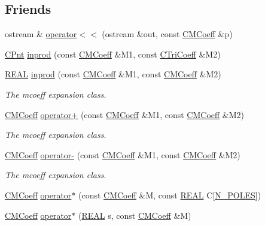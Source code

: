 \subsection*{Friends}
\begin{DoxyCompactItemize}
\item 
ostream \& \hyperlink{classCMCoeff_af219e14c617a293aad17ddf8f055db85}{operator$<$$<$} (ostream \&out, const \hyperlink{classCMCoeff}{C\-M\-Coeff} \&p)
\item 
\hyperlink{classCPnt}{C\-Pnt} \hyperlink{classCMCoeff_a095588ecdb857546a57e3f8f33ec983d}{inprod} (const \hyperlink{classCMCoeff}{C\-M\-Coeff} \&M1, const \hyperlink{classCTriCoeff}{C\-Tri\-Coeff} \&M2)
\item 
\hyperlink{util_8h_a5821460e95a0800cf9f24c38915cbbde}{R\-E\-A\-L} \hyperlink{classCMCoeff_a90c84c259a220e291cebf52d99560c61}{inprod} (const \hyperlink{classCMCoeff}{C\-M\-Coeff} \&M1, const \hyperlink{classCMCoeff}{C\-M\-Coeff} \&M2)
\begin{DoxyCompactList}\small\item\em The mcoeff expansion class. \end{DoxyCompactList}\item 
\hyperlink{classCMCoeff}{C\-M\-Coeff} \hyperlink{classCMCoeff_ab6e8a538afe3d4f8de9c1fa4904479ec}{operator+} (const \hyperlink{classCMCoeff}{C\-M\-Coeff} \&M1, const \hyperlink{classCMCoeff}{C\-M\-Coeff} \&M2)
\begin{DoxyCompactList}\small\item\em The mcoeff expansion class. \end{DoxyCompactList}\item 
\hyperlink{classCMCoeff}{C\-M\-Coeff} \hyperlink{classCMCoeff_a2f5f513c1e1864710b85443edbbc311a}{operator-\/} (const \hyperlink{classCMCoeff}{C\-M\-Coeff} \&M1, const \hyperlink{classCMCoeff}{C\-M\-Coeff} \&M2)
\begin{DoxyCompactList}\small\item\em The mcoeff expansion class. \end{DoxyCompactList}\item 
\hyperlink{classCMCoeff}{C\-M\-Coeff} \hyperlink{classCMCoeff_a794db3eaa0d9cf84e4c8ca1023e4f54a}{operator$\ast$} (const \hyperlink{classCMCoeff}{C\-M\-Coeff} \&M, const \hyperlink{util_8h_a5821460e95a0800cf9f24c38915cbbde}{R\-E\-A\-L} C\mbox{[}\hyperlink{mcoeff_8h_ac23f9c13c5d07d9ce386f7a830c35e5a}{N\-\_\-\-P\-O\-L\-E\-S}\mbox{]})
\item 
\hyperlink{classCMCoeff}{C\-M\-Coeff} \hyperlink{classCMCoeff_a4bebac156440468c712dfce37bc9fc7c}{operator$\ast$} (\hyperlink{util_8h_a5821460e95a0800cf9f24c38915cbbde}{R\-E\-A\-L} s, const \hyperlink{classCMCoeff}{C\-M\-Coeff} \&M)

\end{DoxyCompactItemize}
